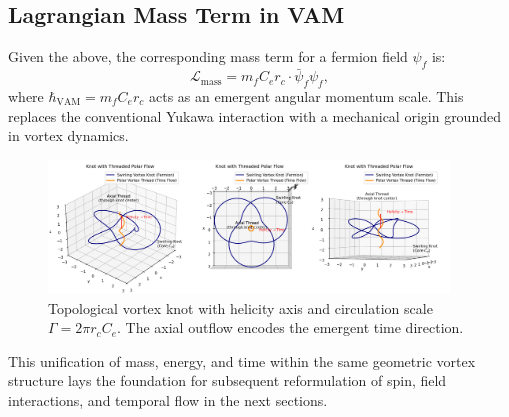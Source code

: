 \subsection{Lagrangian Mass Term in VAM}

Given the above, the corresponding mass term for a fermion field $\psi_f$ is:
\begin{equation}
    \mathcal{L}_\text{mass} = m_f C_e r_c \cdot \bar{\psi}_f \psi_f,
\end{equation}
where \( \hbar_\text{VAM} = m_f C_e r_c \) acts as an emergent angular momentum scale. This replaces the conventional Yukawa interaction with a mechanical origin grounded in vortex dynamics.

\begin{figure}[H]
    \centering
    \includegraphics[width=0.95\textwidth]{KnotThreadedPolarFlow.png}
    \caption{Topological vortex knot with helicity axis and circulation scale \( \Gamma = 2\pi r_c C_e \). The axial outflow encodes the emergent time direction.}
\end{figure}

This unification of mass, energy, and time within the same geometric vortex structure lays the foundation for subsequent reformulation of spin, field interactions, and temporal flow in the next sections.
